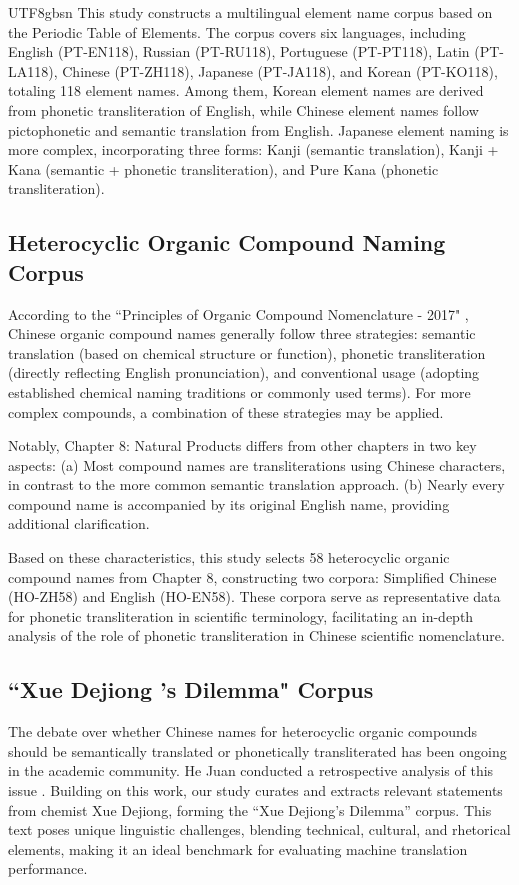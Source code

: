 \documentclass[conference]{IEEEtran}
\begin{document}
\begin{CJK*}{UTF8}{gbsn}
This study constructs a multilingual element name corpus based on the Periodic Table of Elements. The corpus covers six languages, including English (PT-EN118), Russian (PT-RU118), Portuguese (PT-PT118), Latin (PT-LA118), Chinese (PT-ZH118), Japanese (PT-JA118), and Korean (PT-KO118), totaling 118 element names. Among them, Korean element names are derived from phonetic transliteration of English, while Chinese element names follow pictophonetic and semantic translation from English. Japanese element naming is more complex, incorporating three forms: Kanji (semantic translation), Kanji + Kana (semantic + phonetic transliteration), and Pure Kana (phonetic transliteration).

\subsection{Heterocyclic Organic Compound Naming Corpus}
According to the “Principles of Organic Compound Nomenclature - 2017" \citep{ccs2017nomenclature}, Chinese organic compound names generally follow three strategies: semantic translation (based on chemical structure or function), phonetic transliteration (directly reflecting English pronunciation), and conventional usage (adopting established chemical naming traditions or commonly used terms). For more complex compounds, a combination of these strategies may be applied.

Notably, Chapter 8: Natural Products \citep{ccs2017nomenclature} differs from other chapters in two key aspects: (a) Most compound names are transliterations using Chinese characters, in contrast to the more common semantic translation approach. (b) Nearly every compound name is accompanied by its original English name, providing additional clarification.

Based on these characteristics, this study selects 58 heterocyclic organic compound names from Chapter 8, constructing two corpora: Simplified Chinese (HO-ZH58) and English (HO-EN58). These corpora serve as representative data for phonetic transliteration in scientific terminology, facilitating an in-depth analysis of the role of phonetic transliteration in Chinese scientific nomenclature.

\subsection{“Xue Dejiong ’s Dilemma" Corpus}
The debate over whether Chinese names for heterocyclic organic compounds should be semantically translated or phonetically transliterated has been ongoing in the academic community. He Juan conducted a retrospective analysis of this issue \citep{hejuan2019nomencl}. Building on this work, our study curates and extracts relevant statements from chemist Xue Dejiong, forming the “Xue Dejiong’s Dilemma” corpus. This text poses unique linguistic challenges, blending technical, cultural, and rhetorical elements, making it an ideal benchmark for evaluating machine translation performance.


\end{CJK*}
\end{document}
